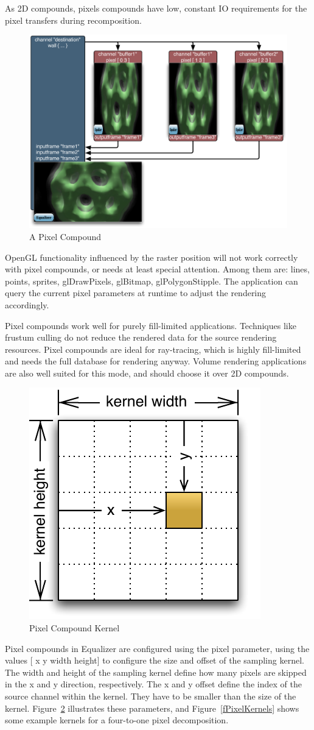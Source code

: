 \documentclass[10pt,a4]{scrartcl}
\newcommand{\fig}[1]{Figure~\ref{#1}}
\begin{document}
As 2D compounds, pixels compounds have low, constant IO requirements for
the pixel transfers during recomposition.

\begin{figure}
  \includegraphics[width=.618\textwidth]{images/Pixel.pdf}
  {\caption{\label{fPixel}\small A Pixel Compound}}
\end{figure}
OpenGL functionality influenced by the raster position will not work
correctly with pixel compounds, or needs at least special
attention. Among them are: lines, points, sprites, glDrawPixels,
glBitmap, glPolygonStipple. The application can query the current pixel
parameters at runtime to adjust the rendering accordingly.

Pixel compounds work well for purely fill-limited applications.
Techniques like frustum culling do not reduce the rendered data for the
source rendering resources. Pixel compounds are ideal for ray-tracing,
which is highly fill-limited and needs the full database for rendering
anyway. Volume rendering applications are also well suited for this
mode, and should choose it over 2D compounds.

\begin{figure}
  \includegraphics[width=.382\textwidth]{images/pixelKernel.pdf}
  {\caption{\label{fPixelKernel}\small Pixel Compound Kernel}}
\end{figure}
Pixel compounds in Equalizer are configured using the \textsf{pixel}
parameter, using the values \textsf{[ x y width height]}  to configure
the size and offset of the sampling kernel. The width and height of the
sampling kernel define how many pixels are skipped in the x and y
direction, respectively. The x and y offset define the index of the
source channel within the kernel. They have to be smaller than the size
of the kernel. \fig{fPixelKernel} illustrates these parameters, and
\fig{fPixelKernels} shows some example kernels for a four-to-one pixel decomposition.
\end{document}
